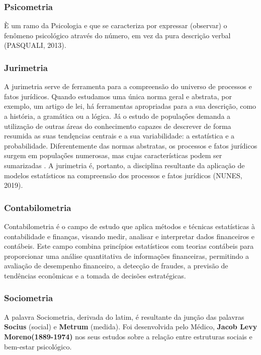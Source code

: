 \subsubsection{Psicometria} 

È um ramo da Psicologia e que se caracteriza por expressar (observar) o fenômeno psicológico através do número, em vez da pura descrição verbal (PASQUALI, 2013). \vskip0.3cm

\subsubsection{Jurimetria} 

A jurimetria serve de ferramenta para a compreensão do universo de processos e fatos jurídicos. Quando estudamos uma única norma geral e abstrata, por exemplo, um artigo de lei, há ferramentas apropriadas para a sua descrição, como a história, a gramática ou a lógica. Já o estudo de populaçőes demanda a utilização de outras áreas do conhecimento capazes de descrever de forma resumida as suas tendęncias centrais e a sua variabilidade: a estatística e a probabilidade. Diferentemente das normas abstratas, os processos e fatos jurídicos surgem em populaçőes numerosas, mas cujas características podem ser sumarizadas . A jurimetria é, portanto, a disciplina resultante da aplicação de modelos estatísticos na compreensão dos processos e fatos jurídicos (NUNES, 2019).\vskip0.3cm

\subsubsection{Contabilometria} 

Contabilometria é o campo de estudo que aplica métodos e técnicas estatísticas à contabilidade e finanças, visando medir, analisar e interpretar dados financeiros e contábeis. Este campo combina princípios estatísticos com teorias contábeis para proporcionar uma análise quantitativa de informações financeiras, permitindo a avaliação de desempenho financeiro, a detecção de fraudes, a previsão de tendências econômicas e a tomada de decisões estratégicas.

\newpage
\subsubsection{Sociometria}

A palavra Sociometria, derivada do latim, é resultante da junção das palavras \textbf{Socius} (social) e \textbf{Metrum} (medida). Foi desenvolvida pelo Médico, \textbf{Jacob Levy Moreno(1889-1974)} nos seus estudos sobre a relação entre estruturas sociais e bem-estar psicológico.\vskip0.3cm


